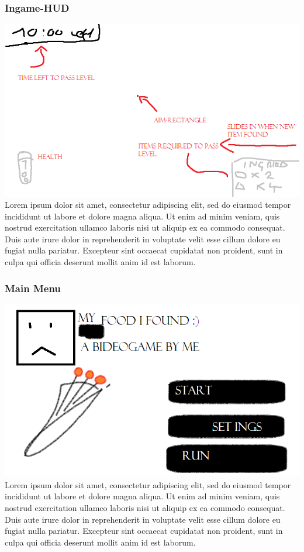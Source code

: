 \documentclass[10pt,a4paper]{article}
\begin{document}
\subsubsection{Ingame-HUD}
\includegraphics[scale=0.669]{mockup}\\
Lorem ipsum dolor sit amet, consectetur adipiscing elit, sed do eiusmod tempor incididunt ut labore et dolore magna aliqua. Ut enim ad minim veniam, quis nostrud exercitation ullamco laboris nisi ut aliquip ex ea commodo consequat. Duis aute irure dolor in reprehenderit in voluptate velit esse cillum dolore eu fugiat nulla pariatur. Excepteur sint occaecat cupidatat non proident, sunt in culpa qui officia deserunt mollit anim id est laborum.
\subsubsection{Main Menu}
\includegraphics[scale=0.669]{mockup_mainmenu}\\
Lorem ipsum dolor sit amet, consectetur adipiscing elit, sed do eiusmod tempor incididunt ut labore et dolore magna aliqua. Ut enim ad minim veniam, quis nostrud exercitation ullamco laboris nisi ut aliquip ex ea commodo consequat. Duis aute irure dolor in reprehenderit in voluptate velit esse cillum dolore eu fugiat nulla pariatur. Excepteur sint occaecat cupidatat non proident, sunt in culpa qui officia deserunt mollit anim id est laborum.
\end{document}
